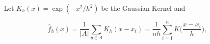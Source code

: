 Let  $K_h(x) = \exp( -x^2/h^2)$ be the Gaussian Kernel and

\[
    \hat{f}_h(x) = \frac{1}{|A|}\sum_{ y \in A} K_h (x - x_i) = \frac{1}{nh} \sum_{i=1}^n K\Big(\frac{x-x_i}{h}\Big),
  \]